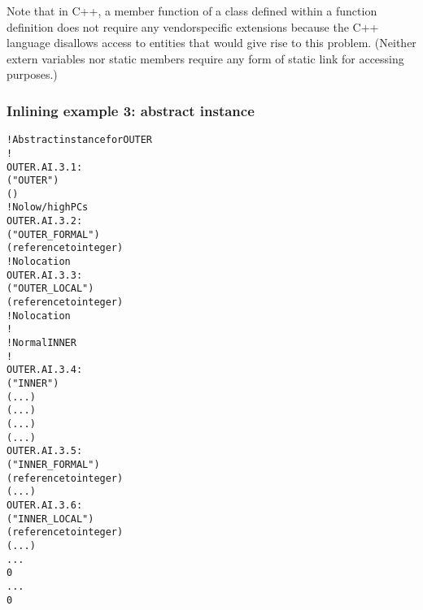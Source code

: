 Note that in C++, a member function of a class defined within
a function definition does not require any vendor\dash specific
extensions because the C++ language disallows access to
entities that would give rise to this problem. (Neither extern
variables nor static members require any form of static link
for accessing purposes.)

\subsubsection{Inlining example 3: abstract instance}
\label{app:inliningexample3abstractinstance}
\begin{alltt}
    ! Abstract instance for OUTER
    !
OUTER.AI.3.1:
        ("OUTER")
        ()
        ! No low/high PCs
OUTER.AI.3.2:
            ("OUTER\_FORMAL")
            (reference to integer)
            ! No location
OUTER.AI.3.3:
            ("OUTER\_LOCAL")
            (reference to integer)
            ! No location
        !
        ! Normal INNER
        !
OUTER.AI.3.4:
            ("INNER")
            (...)
            (...)
            (...)
            (...)
OUTER.AI.3.5:
                ("INNER\_FORMAL")
                (reference to integer)
                (...)
OUTER.AI.3.6:
                ("INNER\_LOCAL")
                (reference to integer)
                (...)
            ...
            0
        ...
        0
\end{alltt}


